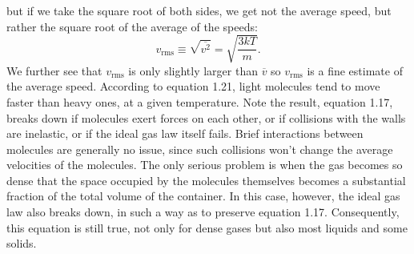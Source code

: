 \documentclass[11pt]{exam}
\begin{document}
but if we take the square root of both sides, we get not the average speed, but rather the square root of the average of the speeds:
\begin{equation}\tag{1.21}
v_{\text{rms}} \equiv \sqrt{\overline{v^2}} = \sqrt{\frac{3kT}{m}}.   
\end{equation}
We further see that $v_{\text{rms}}$ is only slightly larger than $\overline{v}$ so $v_{\text{rms}}$ is a fine estimate of the average speed. According to equation 1.21, light molecules tend to move faster than heavy ones, at a given temperature.
\newpage
\hspace*{10mm}Note the result, equation 1.17, breaks down if molecules exert forces on each other, or if collisions with the walls are inelastic, or if the ideal gas law itself fails. Brief interactions between molecules are generally no issue, since such collisions won't change the average velocities of the molecules. The only serious problem is when the gas becomes so dense that the space occupied by the molecules themselves becomes a substantial fraction of the total volume of the container. In this case, however, the ideal gas law also breaks down, in such a way as to preserve equation 1.17. Consequently, this equation is still true, not only for dense gases but also most liquids and some solids.
\newpage
\end{document}
